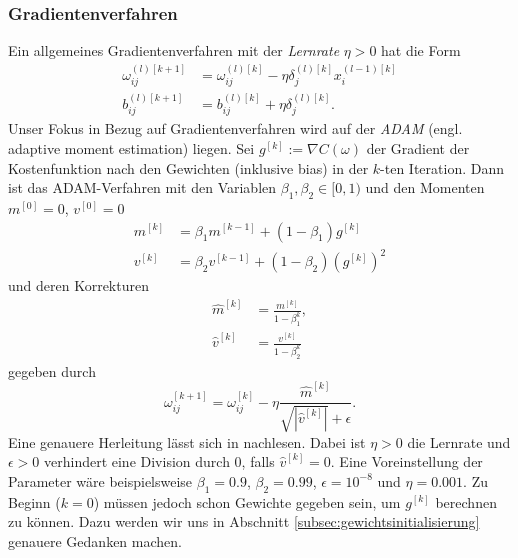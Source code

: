 \subsubsection{Gradientenverfahren}
Ein allgemeines Gradientenverfahren mit der \textit{Lernrate} $\eta > 0$ hat die Form
\begin{align*}
    \omega_{ij}^{(l)[k+1]} &= \omega_{ij}^{(l)[k]} - \eta \delta_{j}^{(l)[k]} x_i^{(l-1)[k]}\\
    b_{ij}^{(l)[k+1]} &= b_{ij}^{(l)[k]} + \eta \delta_{j}^{(l)[k]}.
\end{align*}
Unser Fokus in Bezug auf Gradientenverfahren wird auf der \textit{ADAM} (engl. adaptive moment estimation) liegen. Sei
$g^{[k]} := \nabla C(\omega)$ der Gradient der Kostenfunktion nach den Gewichten (inklusive bias) in der $k$-ten
Iteration. Dann ist das ADAM-Verfahren mit den Variablen $\beta_1,\beta_2 \in [0,1)$ und den Momenten $m^{[0]}=0$,
$v^{[0]}=0$
\begin{align*}
    m^{[k]} &= \beta_1 m^{[k-1]} + (1-\beta_1)g^{[k]} \\
    v^{[k]} &= \beta_2 v^{[k-1]} + (1-\beta_2)(g^{[k]})^2
\end{align*}
und deren Korrekturen
\begin{align*}
    \hat{m}^{[k]} &= \frac{m^{[k]}}{1-\beta_1^k}, \\
    \hat{v}^{[k]} &= \frac{v^{[k]}}{1-\beta_2^k}
\end{align*}
gegeben durch
\[
    \omega_{ij}^{[k+1]}= \omega_{ij}^{[k]} - \eta \frac{\hat{m}^{[k]}}{\sqrt{|\hat{v}^{[k]}|} + \epsilon}.
\]
Eine genauere Herleitung lässt sich in \cite[103-104]{ovidiucalinDeepLearningArchitectures} nachlesen.
Dabei ist $\eta > 0$ die Lernrate und $\epsilon > 0$ verhindert eine Division durch $0$, falls $\hat{v}^{[k]} = 0$. Eine
Voreinstellung der Parameter wäre beispielsweise $\beta_1=0.9$, $\beta_2=0.99$, $\epsilon=10^{-8}$ und $\eta = 0.001$. Zu Beginn ($k=0$)
müssen jedoch schon Gewichte gegeben sein, um $g^{[k]}$ berechnen zu können. Dazu werden wir uns in
Abschnitt \eqref{subsec:gewichtsinitialisierung} genauere Gedanken machen.\\


